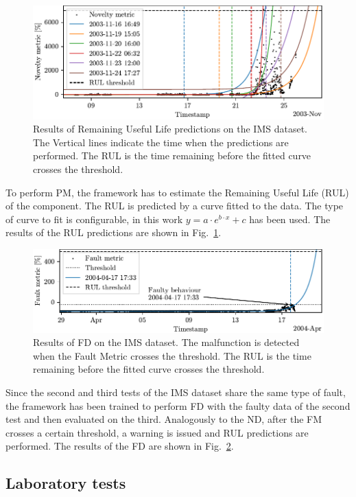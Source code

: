 \begin{figure}
    \includegraphics[width=\linewidth]{images/RUL_IMS.pdf}
    \caption{Results of Remaining Useful Life predictions on the IMS dataset. The Vertical lines indicate the time when the predictions are performed. The RUL is the time remaining before the fitted curve crosses the threshold.}
    \label{fig:RUL_IMS}
\end{figure}
To perform PM, the framework has to estimate the Remaining Useful Life (RUL) of the component. The RUL is predicted by a curve fitted to the data. The type of curve to fit is configurable, in this work $y = a \cdot e^{b \cdot x} + c$ has been used. The results of the RUL predictions are shown in Fig.~\ref{fig:RUL_IMS}.

\begin{figure}
    \includegraphics[width=\linewidth]{images/FD_IMS.pdf}
    \caption{Results of FD on the IMS dataset. The malfunction is detected when the Fault Metric crosses the threshold. The RUL is the time remaining before the fitted curve crosses the threshold.}
    \label{fig:FD_IMS}
\end{figure}
Since the second and third tests of the IMS dataset share the same type of fault, the framework has been trained to perform FD with the faulty data of the second test and then evaluated on the third. Analogously to the ND, after the FM crosses a certain threshold, a warning is issued and RUL predictions are performed. The results of the FD are shown in Fig.~\ref{fig:FD_IMS}.

\subsection{Laboratory tests}

